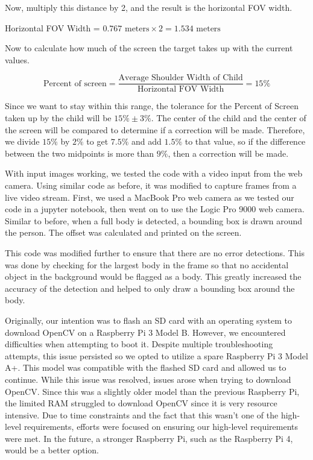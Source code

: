 \documentclass{report}
\begin{document}
  Now, multiply this distance by 2, and the result is the horizontal FOV width.

  Horizontal FOV Width = $0.767 \text{ meters} \times 2 = 1.534 \text{ meters}$ 

  Now to calculate how much of the screen the target takes up with the current values.
  
  \begin{equation}
    \text{Percent of screen} = \frac{\text{Average Shoulder Width of Child}}{\text{Horizontal FOV Width}} = 15\%
  \nonumber
  \end{equation}
  
Since we want to stay within this range, the tolerance for the Percent of Screen taken up by the child will be \(15\% \pm 3\%\). 
The center of the child and the center of the screen will be compared to determine if a correction will be made. Therefore, we divide \( 15\% \) by \( 2\% \) to get \( 7.5\% \) and add \( 1.5\% \) to that value, so if the difference between the two midpoints is more than \( 9\% \), then a correction will be made.

With input images working, we tested the code with a video input from the web camera. Using similar code as before, it was modified to capture frames from a live video stream. First, we used a MacBook Pro web camera as we tested our code in a jupyter notebook, then went on to use the Logic Pro 9000 web camera. Similar to before, when a full body is detected, a bounding box is drawn around the person. The offset was calculated and printed on the screen. 

This code was modified further to ensure that there are no error detections. This was done by checking for the largest body in the frame so that no accidental object in the background would be flagged as a body. This greatly increased the accuracy of the detection and helped to only draw a bounding box around the body. 

Originally, our intention was to flash an SD card with an operating system to download OpenCV on a Raspberry Pi 3 Model B. However, we encountered difficulties when attempting to boot it. Despite multiple troubleshooting attempts, this issue persisted so we opted to utilize a spare Raspberry Pi 3 Model A+. This model was compatible with the flashed SD card and allowed us to continue. While this issue was resolved, issues arose when trying to download OpenCV. Since this was a slightly older model than the previous Raspberry Pi, the limited RAM struggled to download OpenCV since it is very resource intensive. Due to time constraints and the fact that this wasn’t one of the high-level requirements, efforts were focused on ensuring our high-level requirements were met. In the future, a stronger Raspberry Pi, such as the Raspberry Pi 4, would be a better option. 
\end{document}
